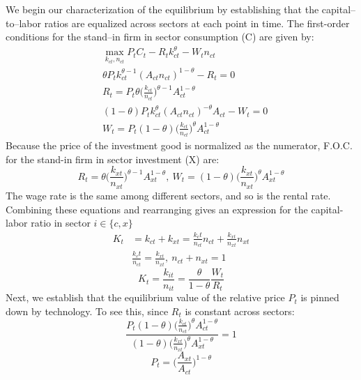 \documentclass{article}
\begin{document}
    We begin our characterization of the equilibrium by establishing that the capital–to–labor ratios are equalized across sectors at each point in time. The first-order conditions for the stand–in firm in sector consumption (C) are given by:
    \begin{align*}
        &\max_{k_{ct},n_{ct}} P_t C_t- R_t k_{ct}^\theta- W_t n_{ct}\\
        &\theta P_t k_{ct}^{\theta-1} (A_{ct} n_{ct})^{1-\theta}-R_t=0\\
        &R_t=P_t \theta \biggl( \frac{k_{ct}}{n_{ct}} \biggr)^{\theta-1} A_{ct}^{1-\theta}\\
        &(1-\theta) P_t k_{ct}^\theta (A_{ct} n_{ct})^{-\theta} A_{ct}-W_t=0\\
        &W_t=P_t (1-\theta) \biggl( \frac{k_{ct}}{n_{ct}} \biggr)^\theta A_{ct}^{1-\theta}
    \end{align*}
    Because the price of the investment good is normalized as the numerator, F.O.C. for the stand-in firm in sector investment (X) are:
    \begin{equation*}
        R_t=\theta \biggl( \frac{k_{xt}}{n_{xt}} \biggr)^{\theta-1} A_{xt}^{1-\theta},\ W_t=(1-\theta) \biggl( \frac{k_{xt}}{n_{xt}} \biggr)^\theta A_{xt}^{1-\theta}
    \end{equation*}
    The wage rate is the same among different sectors, and so is the rental rate. Combining these equations and rearranging gives an expression for the capital-labor ratio in sector $i \in \{c,x\}$
    \begin{align*}
        K_t&=k_{ct}+k_{xt}=\frac{k_ct}{n_{ct}}n_{ct}+\frac{k_{xt}}{n_{xt}}n_{xt}\\
        &\frac{k_ct}{n_{ct}}=\frac{k_{xt}}{n_{xt}},\ n_{ct}+n_{xt}=1
    \end{align*}
    \begin{equation}
        K_t=\frac{k_{it}}{n_{it}}=\frac{\theta}{1-\theta}\frac{W_t}{R_t}
    \end{equation}
    Next, we establish that the equilibrium value of the relative price $P_t$ is pinned down by technology. To see this, since $R_t$ is constant across sectors:
    \begin{equation*}
        \frac{P_t (1-\theta) \biggl( \frac{k_{ct}}{n_{ct}} \biggr)^\theta A_{ct}^{1-\theta}}{(1-\theta) \biggl( \frac{k_{xt}}{n_{xt}} \biggr)^\theta A_{xt}^{1-\theta}}=1
    \end{equation*}
    \begin{equation}
        P_t=\biggl( \frac{A_{xt}}{A_{ct}} \biggr)^{1-\theta}
    \end{equation}
\end{document}
